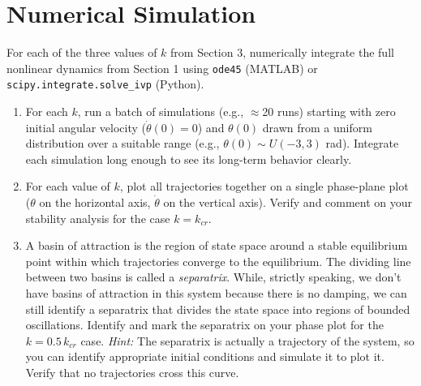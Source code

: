 \documentclass[11pt,letterpaper]{article}
\begin{document}
\section{Numerical Simulation}

For each of the three values of $k$ from Section 3, numerically integrate the full nonlinear dynamics from Section 1 using \texttt{ode45} (MATLAB) or \texttt{scipy.integrate.solve\_ivp} (Python).

\begin{enumerate}[label=(\alph*)]
    \item For each $k$, run a batch of simulations (e.g., $\approx$20 runs) starting with zero initial angular velocity ($\dot\theta(0) = 0$) and $\theta(0)$ drawn from a uniform distribution over a suitable range (e.g., $\theta(0) \sim U(-3,3)$ rad). Integrate each simulation long enough to see its long-term behavior clearly.
    \item For each value of $k$, plot all trajectories together on a single phase-plane plot ($\theta$ on the horizontal axis, $\dot\theta$ on the vertical axis). Verify and comment on your stability analysis for the case $k=k_{cr}$.
    \item A basin of attraction is the region of state space around a stable equilibrium point within which trajectories converge to the equilibrium. The dividing line between two basins is called a \emph{separatrix}. While, strictly speaking, we don't have basins of attraction in this system because there is no damping, we can still identify a separatrix that divides the state space into regions of bounded oscillations. Identify and mark the separatrix on your phase plot for the $k = 0.5\,k_{cr}$ case. \emph{Hint:} The separatrix is actually a trajectory of the system, so you can identify appropriate initial conditions and simulate it to plot it. Verify that no trajectories cross this curve.
\end{enumerate}
\end{document}
